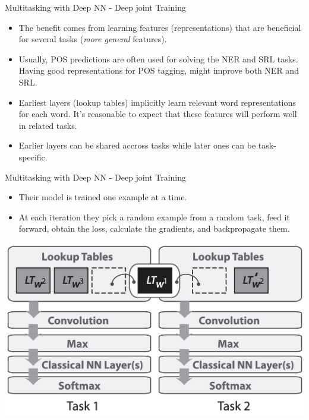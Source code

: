 \documentclass[handout]{beamer} %
\begin{document}
  \begin{frame}{Multitasking with Deep NN - Deep joint Training}
      \begin{itemize}[<+->]
          \item The benefit comes from learning features (representations) that
              are beneficial for several tasks (\textit{more general} features).
          \item Usually, POS predictions are often used for solving
              the NER and SRL tasks. Having good representations for POS
              tagging, might improve both NER and SRL.
          \item Earliest layers (lookup tables) implicitly learn relevant word
              representations for each word. It's reasonable to expect that
              these features will perform well in related tasks.
          \item Earlier layers can be shared accross tasks while later ones can
              be task-specific.
      \end{itemize}
      
  \end{frame}

  \begin{frame}{Multitasking with Deep NN - Deep joint Training}
      \begin{itemize}[<+->]
          \item Their model is trained one example at a time.
          \item At each iteration
              they pick a random example from a random task, feed it forward,
              obtain the loss, calculate the gradients, and backpropagate them.
      \end{itemize}

      \begin{center}
        \pause[\thebeamerpauses]\includegraphics[scale=0.2]{imgs/sharing.png}
      \end{center}
      
  \end{frame}
\end{document}
